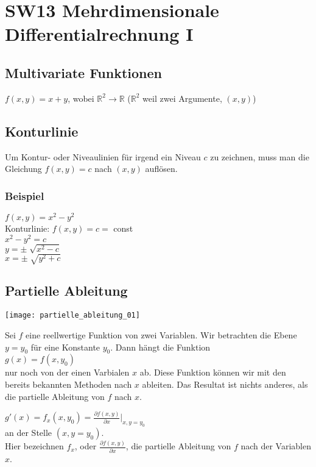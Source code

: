 \documentclass[../main.tex]{subfiles}
\begin{document}
\chapter{SW13 Mehrdimensionale Differentialrechnung I}
\section{Multivariate Funktionen}
$f(x,y)=x+y$, wobei $\mathbb{R}^2\to\mathbb{R}$ ($\mathbb{R}^2$ weil zwei Argumente, $(x,y)$) \\

\section{Konturlinie}
Um Kontur- oder Niveaulinien für irgend ein Niveau $c$ zu zeichnen, muss man die 
Gleichung $f(x,y)=c$ nach $(x,y)$ auflösen.

\subsection{Beispiel}
$f(x,y)=x^2-y^2$ \\ [7pt]
Konturlinie: $f(x,y)=c=$ const \\ [7pt]
$x^2-y^2=c$ \\ [7pt]
$y=\pm\sqrt[]{x^2-c}$ \\ [7pt]
$x=\pm\sqrt[]{y^2+c} $

\section{Partielle Ableitung}
\begin{minipage}{0.45\textwidth}
    \texttt{[image: partielle\_ableitung\_01]}
\end{minipage} \hfill
\begin{minipage}{0.5\textwidth}
    Sei $f$ eine reellwertige Funktion von zwei Variablen. Wir betrachten die Ebene $y=y_0$ für eine Konstante 
    $y_0$. Dann hängt die Funktion \\ [7pt]
    $g(x)=f(x,y_0)$ \\ [7pt]
    nur noch von der einen Varbialen $x$ ab. Diese Funktion können wir mit den bereits bekannten Methoden nach
    $x$ ableiten. Das Resultat ist nichts anderes, als die partielle Ableitung von $f$ nach $x$. \\
\end{minipage}
$g'(x)=f_x(x,y_0)=\frac{\partial f(x,y)}{\partial x}|_{x,y=y_0}$ \\ [7pt]
an der Stelle $(x,y=y_0)$. \\
Hier bezeichnen $f_x$, oder $\frac{\partial f(x,y)}{\partial x}$, die partielle Ableitung von $f$ nach der Variablen $x$. \\
\end{document}
